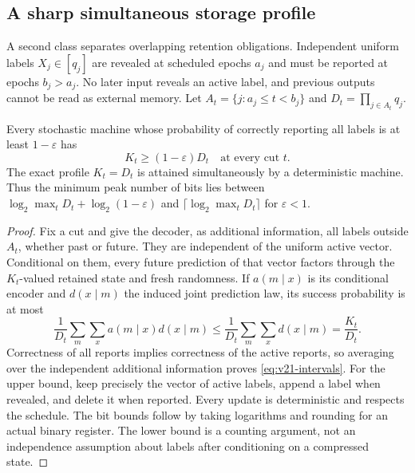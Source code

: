 \subsection{A sharp simultaneous storage profile}
A second class separates overlapping retention obligations. Independent
uniform labels $X_j\in[q_j]$ are revealed at scheduled epochs $a_j$ and
must be reported at epochs $b_j>a_j$. No later input reveals an active
label, and previous outputs cannot be read as external memory. Let
$A_t=\{j:a_j\le t<b_j\}$ and $D_t=\prod_{j\in A_t}q_j$.

\begin{theorem}\label{thm:v21-intervals}
Every stochastic machine whose probability of correctly reporting all
labels is at least $1-\varepsilon$ has
\begin{equation}\label{eq:v21-intervals}
 K_t\ge(1-\varepsilon)D_t\quad\text{at every cut }t.
\end{equation}
The exact profile $K_t=D_t$ is attained simultaneously by a deterministic
machine. Thus the minimum peak number of bits lies between
$\log_2\max_t D_t+\log_2(1-\varepsilon)$ and
$\lceil\log_2\max_t D_t\rceil$ for $\varepsilon<1$.
\end{theorem}
\begin{proof}
Fix a cut and give the decoder, as additional information, all labels
outside $A_t$, whether past or future. They are independent of the
uniform active vector. Conditional on them, every future prediction of
that vector factors through the $K_t$-valued retained state and fresh
randomness. If $a(m\mid x)$ is its conditional encoder and $d(x\mid m)$
the induced joint prediction law, its success probability is at most
\[
 \frac1{D_t}\sum_m\sum_xa(m\mid x)d(x\mid m)
 \le\frac1{D_t}\sum_m\sum_x d(x\mid m)
 =\frac{K_t}{D_t}.
\]
Correctness of all reports implies correctness of the active reports,
so averaging over the independent additional information proves
\eqref{eq:v21-intervals}. For the upper bound, keep precisely the vector
of active labels, append a label when revealed, and delete it when
reported. Every update is deterministic and respects the schedule.
The bit bounds follow by taking logarithms and rounding for an actual
binary register. The lower bound is a counting argument, not an
independence assumption about labels after conditioning on a compressed
state.
\end{proof}
